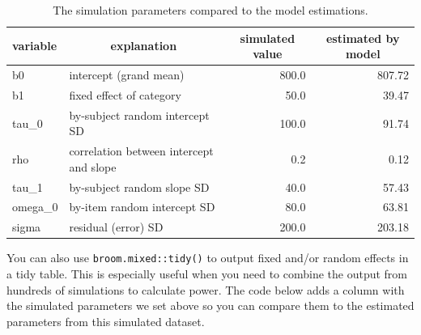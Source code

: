 \documentclass[english,doc,floatsintext]{apa6}
\newenvironment{Shaded}{\begin{snugshade}}{\end{snugshade}}
\newcommand{\CommentTok}[1]{\textcolor[rgb]{0.56,0.35,0.01}{\textit{#1}}}
\newcommand{\DataTypeTok}[1]{\textcolor[rgb]{0.13,0.29,0.53}{#1}}
\newcommand{\DecValTok}[1]{\textcolor[rgb]{0.00,0.00,0.81}{#1}}
\newcommand{\KeywordTok}[1]{\textcolor[rgb]{0.13,0.29,0.53}{\textbf{#1}}}
\newcommand{\NormalTok}[1]{#1}
\newcommand{\OperatorTok}[1]{\textcolor[rgb]{0.81,0.36,0.00}{\textbf{#1}}}
\newcommand{\StringTok}[1]{\textcolor[rgb]{0.31,0.60,0.02}{#1}}
\begin{document}
\begin{table}[H]

\begin{center}
\begin{threeparttable}

\caption{\label{tab:param-compare}The simulation parameters compared to the model estimations.}

\begin{tabular}{llrr}
\toprule
variable & \multicolumn{1}{c}{explanation} & \multicolumn{1}{c}{simulated value} & \multicolumn{1}{c}{estimated by model}\\
\midrule
b0 & intercept (grand mean) & 800.0 & 807.72\\
b1 & fixed effect of category & 50.0 & 39.47\\
tau\_0 & by-subject random intercept SD & 100.0 & 91.74\\
rho & correlation between intercept and slope & 0.2 & 0.12\\
tau\_1 & by-subject random slope SD & 40.0 & 57.43\\
omega\_0 & by-item random intercept SD & 80.0 & 63.81\\
sigma & residual (error) SD & 200.0 & 203.18\\
\bottomrule
\end{tabular}

\end{threeparttable}
\end{center}

\end{table}

You can also use \texttt{broom.mixed::tidy()} to output fixed and/or random effects in a tidy table. This is especially useful when you need to combine the output from hundreds of simulations to calculate power. The code below adds a column with the simulated parameters we set above so you can compare them to the estimated parameters from this simulated dataset.

\begin{Shaded}
\end{Shaded}
\end{document}
